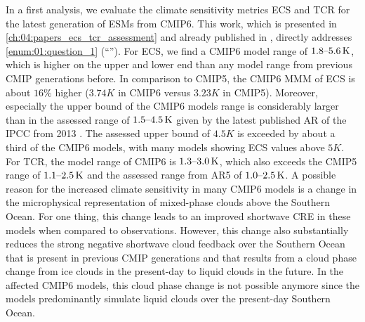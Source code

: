 In a first analysis, we evaluate the climate sensitivity metrics \ac{ECS} and
\ac{TCR} for the latest generation of \acp{ESM} from \acs{CMIP}6. This work,
which is presented in \cref{ch:04:papers_ecs_tcr_assessment} and already
published in \textcite{Bock2020, Meehl2020}, directly addresses
\cref{enum:01:question_1} (\enquote{\KeyScienceQuestionOne{}}). For \ac{ECS},
we find a \acs{CMIP}6 model range of $\rangeunit{1.8}{5.6}{K}$, which is higher
on the upper and lower end than any model range from previous \ac{CMIP}
generations before. In comparison to \acs{CMIP}5, the \acs{CMIP}6 \ac{MMM} of
\ac{ECS} is about $16 \unit{\%}$ higher ($3.74 \unit{K}$ in \acs{CMIP}6 versus
$3.23 \unit{K}$ in \acs{CMIP}5). Moreover, especially the upper bound of the
\acs{CMIP}6 models range is considerably larger than in the assessed range of
$\rangeunit{1.5}{4.5}{K}$ given by the latest published \ac{AR} of the
\ac{IPCC} from 2013 \autocite{Stocker2013}. The assessed upper bound of $4.5
\unit{K}$ is exceeded by about a third of the \acs{CMIP}6 models, with many
models showing \ac{ECS} values above $5 \unit{K}$. For \ac{TCR}, the model
range of \acs{CMIP}6 is $\rangeunit{1.3}{3.0}{K}$, which also exceeds the
\acs{CMIP}5 range of $\rangeunit{1.1}{2.5}{K}$ and the assessed range from
\acs{AR}5 of $\rangeunit{1.0}{2.5}{K}$. A possible reason for the increased
climate sensitivity in many \acs{CMIP}6 models is a change in the microphysical
representation of mixed-phase clouds above the Southern Ocean. For one thing,
this change leads to an improved shortwave \ac{CRE} in these models when
compared to observations. However, this change also substantially reduces the
strong negative shortwave cloud feedback over the Southern Ocean that is
present in previous \ac{CMIP} generations and that results from a cloud phase
change from ice clouds in the present-day to liquid clouds in the future. In
the affected \acs{CMIP}6 models, this cloud phase change is not possible
anymore since the models predominantly simulate liquid clouds over the
present-day Southern Ocean.

